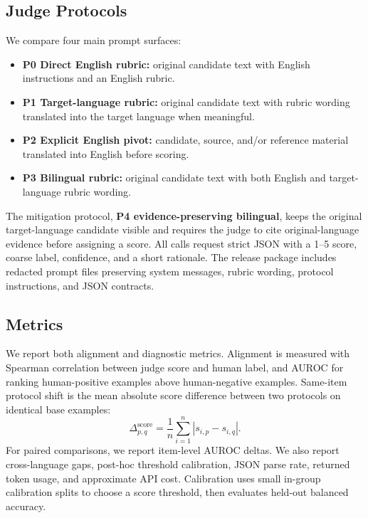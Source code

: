 \documentclass{article}
\begin{document}
\subsection{Judge Protocols}

We compare four main prompt surfaces:
\begin{itemize}
    \item \textbf{P0 Direct English rubric:} original candidate text with English instructions and an English rubric.
    \item \textbf{P1 Target-language rubric:} original candidate text with rubric wording translated into the target language when meaningful.
    \item \textbf{P2 Explicit English pivot:} candidate, source, and/or reference material translated into English before scoring.
    \item \textbf{P3 Bilingual rubric:} original candidate text with both English and target-language rubric wording.
\end{itemize}
The mitigation protocol, \textbf{P4 evidence-preserving bilingual}, keeps the original target-language candidate visible and requires the judge to cite original-language evidence before assigning a score. All calls request strict JSON with a 1--5 score, coarse label, confidence, and a short rationale. The release package includes redacted prompt files preserving system messages, rubric wording, protocol instructions, and JSON contracts.

\subsection{Metrics}

We report both alignment and diagnostic metrics. Alignment is measured with Spearman correlation between judge score and human label, and AUROC for ranking human-positive examples above human-negative examples. Same-item protocol shift is the mean absolute score difference between two protocols on identical base examples:
\begin{equation}
    \Delta_{p,q}^{\mathrm{score}} = \frac{1}{n}\sum_{i=1}^{n} |s_{i,p} - s_{i,q}|.
\end{equation}
For paired comparisons, we report item-level AUROC deltas. We also report cross-language gaps, post-hoc threshold calibration, JSON parse rate, returned token usage, and approximate API cost. Calibration uses small in-group calibration splits to choose a score threshold, then evaluates held-out balanced accuracy.
\end{document}
